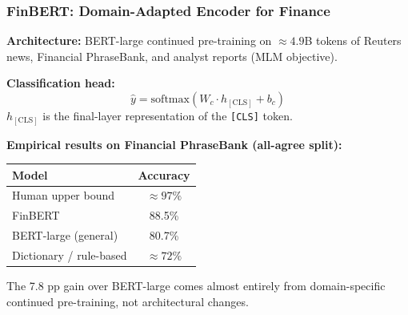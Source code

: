 \documentclass[9pt,t]{beamer}
\begin{document}
\begin{frame}
\frametitle{FinBERT: Domain-Adapted Encoder for Finance}

\textbf{Architecture:} BERT-large continued pre-training on $\approx 4.9$B tokens
of Reuters news, Financial PhraseBank, and analyst reports (MLM objective).

\medskip
\textbf{Classification head:}
\[
  \hat{y} = \mathrm{softmax}(W_c \cdot h_{[\text{CLS}]} + b_c)
\]
$h_{[\text{CLS}]}$ is the final-layer representation of the \texttt{[CLS]} token.

\medskip
\textbf{Empirical results on Financial PhraseBank (all-agree split):}

\medskip
\begin{center}
\begin{tabular}{lc}
\toprule
\textbf{Model} & \textbf{Accuracy} \\
\midrule
Human upper bound & $\approx 97\%$ \\
FinBERT           & 88.5\% \\
BERT-large (general) & 80.7\% \\
Dictionary / rule-based & $\approx 72\%$ \\
\bottomrule
\end{tabular}
\end{center}

\medskip
The 7.8 pp gain over BERT-large comes almost entirely from domain-specific
continued pre-training, not architectural changes.
\end{frame}
\end{document}
